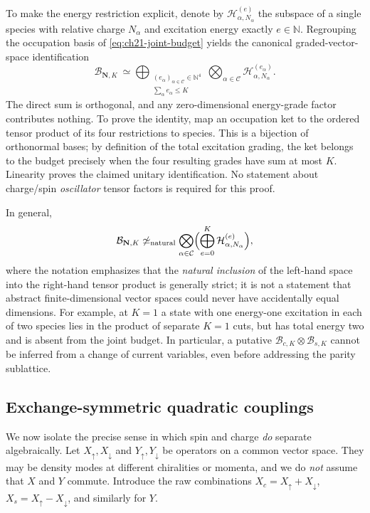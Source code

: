 To make the energy restriction explicit, denote by
$\mathcal H_{\alpha,N_\alpha}^{(e)}$ the subspace of a single
species with relative charge $N_\alpha$ and excitation energy exactly
$e\in\mathbb N$.  Regrouping the occupation basis of
\eqref{eq:ch21-joint-budget} yields the canonical graded-vector-space
identification
\begin{equation}
 \mathcal B_{\mathbf N,K}\ \simeq\!
 \bigoplus_{\substack{(e_\alpha)_{\alpha\in\mathcal C}\in\mathbb N^4\\
                    \sum_\alpha e_\alpha\leq K}}
 \bigotimes_{\alpha\in\mathcal C}
       \mathcal H_{\alpha,N_\alpha}^{(e_\alpha)}.
 \label{eq:ch21-budget-energy-sum}
\end{equation}
The direct sum is orthogonal, and any zero-dimensional energy-grade
factor contributes nothing.  To prove the identity, map an occupation
ket to the ordered tensor product of its four restrictions to species.
This is a bijection of orthonormal bases; by definition of the total
excitation grading, the ket belongs to the budget precisely when the
four resulting grades have sum at most $K$.  Linearity proves the
claimed unitary identification.  No statement about charge/spin
\emph{oscillator} tensor factors is required for this proof.

In general,
\begin{equation}
  \mathcal B_{\mathbf N,K}
  \not\simeq_{\mathrm{natural}}
  \bigotimes_{\alpha\in\mathcal C}
      \Bigl(\bigoplus_{e=0}^{K}
             \mathcal H_{\alpha,N_\alpha}^{(e)}\Bigr),
 \label{eq:ch21-not-product-cutoff}
\end{equation}
where the notation emphasizes that the \emph{natural inclusion} of
the left-hand space into the right-hand tensor product is generally
strict; it is not a statement that abstract finite-dimensional vector
spaces could never have accidentally equal dimensions.  For example,
at $K=1$ a state with one energy-one excitation in each of two
species lies in the product of separate $K=1$ cuts, but has total
energy two and is absent from the joint budget.  In particular, a
putative $\mathcal B_{c,K}\otimes\mathcal B_{s,K}$ cannot be inferred
from a change of current variables, even before addressing the parity
sublattice.

\subsection*{Exchange-symmetric quadratic couplings}

We now isolate the precise sense in which spin and charge \emph{do}
separate algebraically.  Let $X_\uparrow,X_\downarrow$ and
$Y_\uparrow,Y_\downarrow$ be operators on a common vector space.
They may be density modes at different chiralities or momenta, and
we do \emph{not} assume that $X$ and $Y$ commute.  Introduce the raw
combinations $X_c=X_\uparrow+X_\downarrow$,
$X_s=X_\uparrow-X_\downarrow$, and similarly for $Y$.

